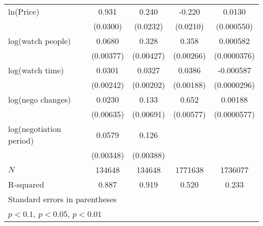 {\begin{tabular}{l*{4}{c}}
\addlinespace
ln(Price)&       0.931\sym{***}&       0.240\sym{***}&      -0.220\sym{***}&      0.0130\sym{***}\\
            &    (0.0300)         &    (0.0232)         &    (0.0210)         &  (0.000550)         \\
\addlinespace
log(watch people)&      0.0680\sym{***}&       0.328\sym{***}&       0.358\sym{***}&    0.000582\sym{***}\\
            &   (0.00377)         &   (0.00427)         &   (0.00266)         & (0.0000376)         \\
\addlinespace
log(watch time)&      0.0301\sym{***}&      0.0327\sym{***}&      0.0386\sym{***}&   -0.000587\sym{***}\\
            &   (0.00242)         &   (0.00202)         &   (0.00188)         & (0.0000296)         \\
\addlinespace
log(nego changes)&      0.0230\sym{***}&       0.133\sym{***}&       0.652\sym{***}&     0.00188\sym{***}\\
            &   (0.00635)         &   (0.00691)         &   (0.00577)         & (0.0000577)         \\
\addlinespace
log(negotiation period)&      0.0579\sym{***}&       0.126\sym{***}&                     &                     \\
            &   (0.00348)         &   (0.00388)         &                     &                     \\
\midrule
\(N\)       &      134648         &      134648         &     1771638         &     1736077         \\
R-squared   &       0.887         &       0.919         &       0.520         &       0.233         \\
\bottomrule
\multicolumn{5}{l}{\footnotesize Standard errors in parentheses}\\
\multicolumn{5}{l}{\footnotesize \sym{*} \(p<0.1\), \sym{**} \(p<0.05\), \sym{***} \(p<0.01\)}\\
\end{tabular}
}
